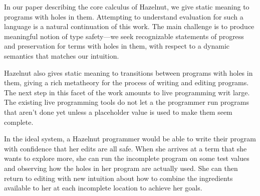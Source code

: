 In our paper describing the core calculus of Hazelnut, we give static
meaning to programs with holes in them.\cite{} Attempting to understand
evaluation for such a language is a natural continuation of this work. The
main challenge is to produce meaningful notion of type safety---we seek
recognizable statements of progress and preservation for terms with holes
in them, with respect to a dynamic semantics that matches our intuition.

Hazelnut also gives static meaning to transitions between programs with
holes in them, giving a rich metatheory for the process of writing and
editing programs. The next step in this facet of the work amounts to live
programming writ large. \cite{} The existing live programming tools do not
let a the programmer run programs that aren't done yet unless a placeholder
value is used to make them seem complete.

In the ideal system, a Hazelnut programmer would be able to write their
program with confidence that her edits are all safe. When she arrives at a
term that she wants to explore more, she can run the incomplete program on
some test values and observing how the holes in her program are actually
used. She can then return to editing with new intuition about how to
combine the ingredients available to her at each incomplete location to
achieve her goals.







